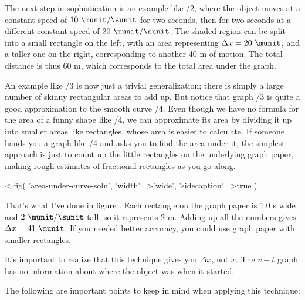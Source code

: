 The next step in sophistication is an example like /2,
where the object moves at a constant speed of $10\ \munit/\sunit$ for two
seconds, then for two seconds at a different constant speed
of $20\ \munit/\sunit$. The shaded region can be split into a small
rectangle on the left, with an area representing $\Delta x=20\ \munit$,
and a taller one on the right, corresponding to another 40 m
of motion. The total distance is thus 60 m, which
corresponds to the total area under the graph.

An example like /3 is now just a trivial generalization;
there is simply a large number of skinny rectangular areas
to add up. But notice that graph /3 is quite a good
approximation to the smooth curve /4. Even though we have
no formula for the area of a funny shape like /4, we can
approximate its area by dividing it up into smaller areas
like rectangles, whose area is easier to calculate. If
someone hands you a graph like /4 and asks you to find the
area under it, the simplest approach is just to count up the
little rectangles on the underlying graph paper, making
rough estimates of fractional rectangles as you go along.

<%
  fig(
    'area-under-curve-soln',
    {
      'width'=>'wide',
      'sidecaption'=>true
    }
  )

That's what I've done in figure . Each rectangle on the graph
paper is 1.0 s wide and $2\ \munit/\sunit$ tall, so it represents 2
m. Adding up all the numbers gives $\Delta x=41\ \munit$. If you needed
better accuracy, you could use graph paper with smaller rectangles.

It's important to realize that this technique gives you
$\Delta x$, not $x$. The $v-t$ graph has no information about
where the object was when it started.

The following are important points to keep in mind when
applying this technique:

